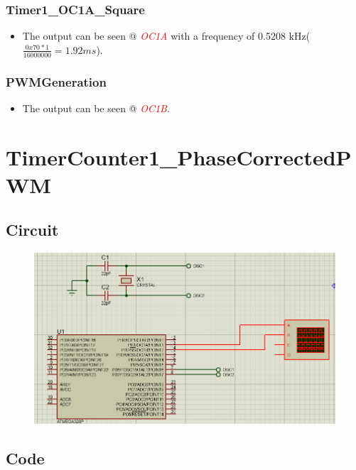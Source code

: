 \documentclass[oneside]{book}
\newcommand{\pinFormat}[1]{\emph{\textcolor{red}{#1}}}
\begin{document}
\subsubsection{Timer1\_OC1A\_Square}
\begin{itemize}
    \item The output can be seen @ \pinFormat{OC1A} with a frequency of 0.5208 kHz($\frac{0x70 * 1}{16000000} = 1.92 ms$).
\end{itemize}
\subsubsection{PWMGeneration}
\begin{itemize}
    \item The output can be seen @ \pinFormat{OC1B}.
\end{itemize}

\section{TimerCounter1\_PhaseCorrectedPWM}
\subsection{Circuit}
\begin{figure}[H]
    \centering
    \includegraphics[height=0.2\textheight]{TimerCounter1_PhaseCorrectedPWM.png}
\end{figure}
\subsection{Code}
\inputminted[breaklines, bgcolor=black]{c}{./programFiles/TimerCounter1_PhaseCorrectedPWM.c}
\end{document}
